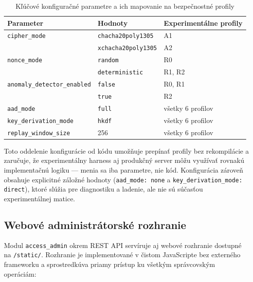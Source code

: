 \documentclass[journal,a4paper,onecolumn]{IEEEtran}
\begin{document}
\begin{table}[htbp]
\renewcommand{\arraystretch}{1.3}
\centering
\caption{Kľúčové konfiguračné parametre a ich mapovanie na bezpečnostné profily}
\label{tab:config-params}
\small
\begin{tabular}{l l l}
\toprule
\textbf{Parameter} & \textbf{Hodnoty} & \textbf{Experimentálne profily} \\
\midrule
\texttt{cipher\_mode} & \texttt{chacha20poly1305} & A1 \\
 & \texttt{xchacha20poly1305} & A2 \\
\texttt{nonce\_mode} & \texttt{random} & R0 \\
 & \texttt{deterministic} & R1, R2 \\
\texttt{anomaly\_detector\_enabled} & \texttt{false} & R0, R1 \\
 & \texttt{true} & R2 \\
\texttt{aad\_mode} & \texttt{full} & všetky 6 profilov \\
\texttt{key\_derivation\_mode} & \texttt{hkdf} & všetky 6 profilov \\
\texttt{replay\_window\_size} & 256 & všetky 6 profilov \\
\bottomrule
\end{tabular}
\end{table}

\noindent Toto oddelenie konfigurácie od kódu umožňuje prepínať profily bez rekompilácie a zaručuje, že experimentálny harness aj produkčný server môžu využívať rovnakú implementačnú logiku --- menia sa iba parametre, nie kód. Konfigurácia zároveň obsahuje explicitné záložné hodnoty (\texttt{aad\_mode: none} a \texttt{key\_derivation\_mode: direct}), ktoré slúžia pre diagnostiku a ladenie, ale nie sú súčasťou experimentálnej matice.

\subsection{Webové administrátorské rozhranie}

Modul \texttt{access\_admin} okrem REST API servíruje aj webové rozhranie dostupné na \texttt{/static/}. Rozhranie je implementované v čistom JavaScripte bez externého frameworku a sprostredkúva priamy prístup ku všetkým správcovským operáciám:
\end{document}
